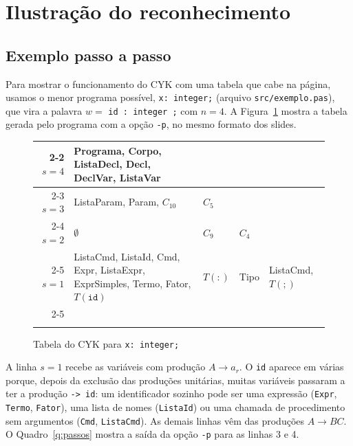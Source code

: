 \documentclass[12pt,a4paper]{article}
\newcommand{\fonte}[1][Elaborado pelos autores (2026).]{%
  \par\vspace{3pt}{\footnotesize Fonte: #1}\par}
\newcommand{\code}[1]{\texttt{#1}}
\begin{document}
\section{Ilustração do reconhecimento}

\subsection{Exemplo passo a passo}

Para mostrar o funcionamento do CYK com uma tabela que cabe na página, usamos o menor programa
possível, \code{x: integer;} (arquivo \code{src/exemplo.pas}), que vira a palavra
$w = $ \code{id : integer ;} com $n = 4$. A Figura~\ref{f:tabela} mostra a tabela gerada pelo
programa com a opção \code{-p}, no mesmo formato dos slides.

\begin{figure}[htbp]
\caption{Tabela do CYK para \code{x: integer;}}\label{f:tabela}
\centering\small
\renewcommand{\arraystretch}{1.3}
\begin{tabular}{r|>{\centering\arraybackslash}p{3.4cm}|>{\centering\arraybackslash}p{2.1cm}|>{\centering\arraybackslash}p{2.1cm}|>{\centering\arraybackslash}p{2.1cm}|}
\cline{2-2}
$s=4$ & Programa, Corpo, ListaDecl, Decl, DeclVar, ListaVar \\
\cline{2-3}
$s=3$ & ListaParam, Param, $C_{10}$ & $C_5$ \\
\cline{2-4}
$s=2$ & $\emptyset$ & $C_9$ & $C_4$ \\
\cline{2-5}
$s=1$ & ListaCmd, ListaId, Cmd, Expr, ListaExpr, ExprSimples, Termo, Fator, $T(\mathtt{id})$ & $T(\mathtt{:})$ & Tipo & ListaCmd, $T(\mathtt{;})$ \\
\cline{2-5}
\multicolumn{1}{r}{} & \multicolumn{1}{c}{\code{id}} & \multicolumn{1}{c}{\code{:}} & \multicolumn{1}{c}{\code{integer}} & \multicolumn{1}{c}{\code{;}} \\
\multicolumn{1}{r}{} & \multicolumn{1}{c}{$r=1$} & \multicolumn{1}{c}{$r=2$} & \multicolumn{1}{c}{$r=3$} & \multicolumn{1}{c}{$r=4$} \\
\end{tabular}
\fonte
\end{figure}

A linha $s=1$ recebe as variáveis com produção $A \to a_r$. O \code{id} aparece em várias
porque, depois da exclusão das produções unitárias, muitas variáveis passaram a ter a produção
\code{-> id}: um identificador sozinho pode ser uma expressão (\code{Expr}, \code{Termo},
\code{Fator}), uma lista de nomes (\code{ListaId}) ou uma chamada de procedimento sem argumentos
(\code{Cmd}, \code{ListaCmd}). As demais linhas vêm das produções $A \to BC$. O
Quadro~\ref{q:passos} mostra a saída da opção \code{-p} para as linhas 3 e 4.
\end{document}
